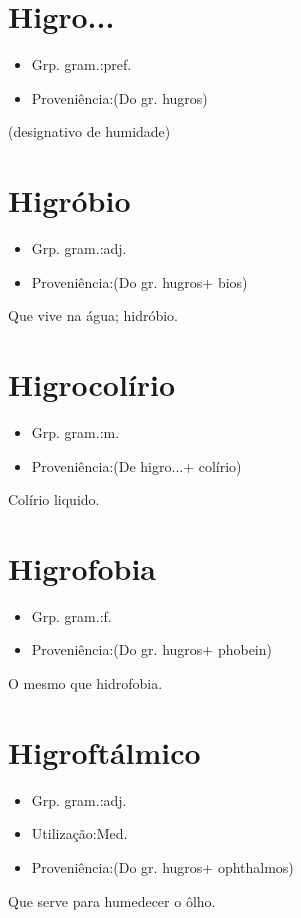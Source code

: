 \documentclass{article}
\begin{document}
\section{Higro...}
\begin{itemize}
\item {Grp. gram.:pref.}
\end{itemize}
\begin{itemize}
\item {Proveniência:(Do gr. \textunderscore hugros\textunderscore )}
\end{itemize}
(designativo de \textunderscore humidade\textunderscore )
\section{Higróbio}
\begin{itemize}
\item {Grp. gram.:adj.}
\end{itemize}
\begin{itemize}
\item {Proveniência:(Do gr. \textunderscore hugros\textunderscore  + \textunderscore bios\textunderscore )}
\end{itemize}
Que vive na água; hidróbio.
\section{Higrocolírio}
\begin{itemize}
\item {Grp. gram.:m.}
\end{itemize}
\begin{itemize}
\item {Proveniência:(De \textunderscore higro...\textunderscore  + \textunderscore colírio\textunderscore )}
\end{itemize}
Colírio liquido.
\section{Higrofobia}
\begin{itemize}
\item {Grp. gram.:f.}
\end{itemize}
\begin{itemize}
\item {Proveniência:(Do gr. \textunderscore hugros\textunderscore  + \textunderscore phobein\textunderscore )}
\end{itemize}
O mesmo que \textunderscore hidrofobia\textunderscore .
\section{Higroftálmico}
\begin{itemize}
\item {Grp. gram.:adj.}
\end{itemize}
\begin{itemize}
\item {Utilização:Med.}
\end{itemize}
\begin{itemize}
\item {Proveniência:(Do gr. \textunderscore hugros\textunderscore  + \textunderscore ophthalmos\textunderscore )}
\end{itemize}
Que serve para humedecer o ôlho.
\end{document}
